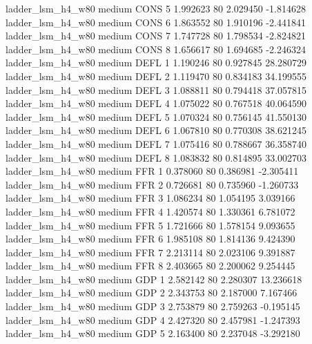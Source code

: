   ladder_lsm_h4_w80     medium     CONS                 5  1.992623 80       2.029450          -1.814628
  ladder_lsm_h4_w80     medium     CONS                 6  1.863552 80       1.910196          -2.441841
  ladder_lsm_h4_w80     medium     CONS                 7  1.747728 80       1.798534          -2.824821
  ladder_lsm_h4_w80     medium     CONS                 8  1.656617 80       1.694685          -2.246324
  ladder_lsm_h4_w80     medium     DEFL                 1  1.190246 80       0.927845          28.280729
  ladder_lsm_h4_w80     medium     DEFL                 2  1.119470 80       0.834183          34.199555
  ladder_lsm_h4_w80     medium     DEFL                 3  1.088811 80       0.794418          37.057815
  ladder_lsm_h4_w80     medium     DEFL                 4  1.075022 80       0.767518          40.064590
  ladder_lsm_h4_w80     medium     DEFL                 5  1.070324 80       0.756145          41.550130
  ladder_lsm_h4_w80     medium     DEFL                 6  1.067810 80       0.770308          38.621245
  ladder_lsm_h4_w80     medium     DEFL                 7  1.075416 80       0.788667          36.358740
  ladder_lsm_h4_w80     medium     DEFL                 8  1.083832 80       0.814895          33.002703
  ladder_lsm_h4_w80     medium      FFR                 1  0.378060 80       0.386981          -2.305411
  ladder_lsm_h4_w80     medium      FFR                 2  0.726681 80       0.735960          -1.260733
  ladder_lsm_h4_w80     medium      FFR                 3  1.086234 80       1.054195           3.039166
  ladder_lsm_h4_w80     medium      FFR                 4  1.420574 80       1.330361           6.781072
  ladder_lsm_h4_w80     medium      FFR                 5  1.721666 80       1.578154           9.093655
  ladder_lsm_h4_w80     medium      FFR                 6  1.985108 80       1.814136           9.424390
  ladder_lsm_h4_w80     medium      FFR                 7  2.213114 80       2.023106           9.391887
  ladder_lsm_h4_w80     medium      FFR                 8  2.403665 80       2.200062           9.254445
  ladder_lsm_h4_w80     medium      GDP                 1  2.582142 80       2.280307          13.236618
  ladder_lsm_h4_w80     medium      GDP                 2  2.343753 80       2.187000           7.167466
  ladder_lsm_h4_w80     medium      GDP                 3  2.753879 80       2.759263          -0.195145
  ladder_lsm_h4_w80     medium      GDP                 4  2.427320 80       2.457981          -1.247393
  ladder_lsm_h4_w80     medium      GDP                 5  2.163400 80       2.237048          -3.292180
